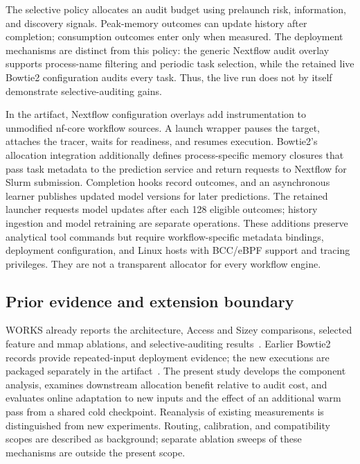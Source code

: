 \label{sec:gates}
The selective policy allocates an audit budget using prelaunch risk,
information, and discovery signals. Peak-memory outcomes can update
history after completion; consumption outcomes enter only when measured.
The deployment mechanisms are distinct from this policy: the generic
Nextflow audit overlay supports process-name filtering and periodic task
selection, while the retained live Bowtie2 configuration audits every task.
Thus, the live run does not by itself demonstrate selective-auditing gains.

In the artifact, Nextflow configuration overlays add instrumentation to
unmodified nf-core workflow sources. A launch wrapper pauses the target,
attaches the tracer, waits for readiness, and resumes execution. Bowtie2's
allocation integration additionally defines process-specific memory
closures that pass task metadata to the prediction service and return
requests to Nextflow for Slurm submission. Completion hooks record
outcomes, and an asynchronous learner publishes updated model versions
for later predictions. The retained launcher requests model updates after
each 128 eligible outcomes; history ingestion and model retraining are
separate operations. These additions preserve analytical tool commands
but require workflow-specific metadata bindings, deployment configuration,
and Linux hosts with BCC/eBPF support and tracing privileges. They are not
a transparent allocator for every workflow engine.

\subsection{Prior evidence and extension boundary}
WORKS already reports the architecture, Access and Sizey comparisons,
selected feature and mmap ablations, and selective-auditing
results~\cite{camp2026works}. Earlier Bowtie2 records provide repeated-input deployment evidence;
the new executions are packaged separately in the artifact~\cite{campArtifact}. The present study develops the
component analysis, examines downstream allocation benefit relative to
audit cost, and
evaluates online adaptation to new inputs and the effect of an additional
warm pass from a shared cold checkpoint. Reanalysis of existing
measurements is distinguished from new experiments. Routing, calibration,
and compatibility scopes are described as background; separate ablation
sweeps of these mechanisms are outside the present scope.

